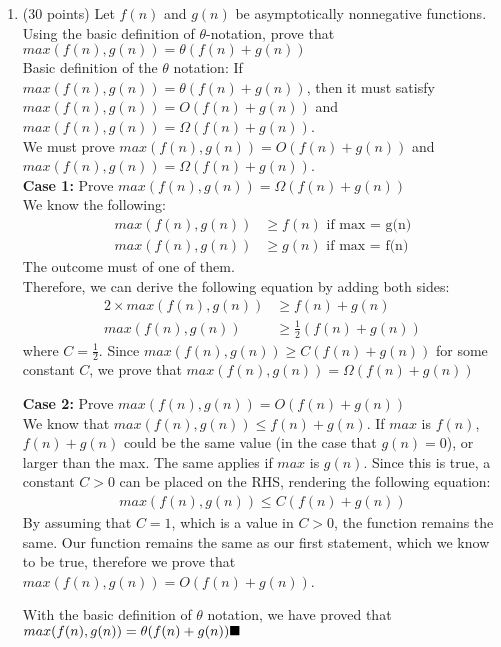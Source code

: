 \documentclass{article}
\begin{document}
    \begin{enumerate}[label=\textbf{Q3}]
        \item (30 points) Let $f(n)$ and $g(n)$ be asymptotically nonnegative functions. Using the basic
        definition of $\theta$-notation, prove that $max(f(n),g(n))= \theta(f(n)+g(n))$\\[0.25in]
        Basic definition of the $\theta$ notation: If $max(f(n),g(n))= \theta(f(n)+g(n))$, then it must 
        satisfy $max(f(n),g(n))= O(f(n)+g(n))$ and $max(f(n),g(n))= \Omega(f(n)+g(n))$.\\
        We must prove $max(f(n),g(n))= O(f(n)+g(n))$ and $max(f(n),g(n))= \Omega(f(n)+g(n))$.\\
        \textbf{Case 1: } Prove $max(f(n),g(n))= \Omega(f(n)+g(n))$\\
        We know the following:
        \begin{align*}
            max(f(n), g(n)) &\geq f(n) \text{ if max = g(n)}\\
            max(f(n), g(n)) &\geq g(n) \text{ if max = f(n)}
        \end{align*}
        The outcome must of one of them.\\
        Therefore, we can derive the following equation by adding both sides:
        \begin{align*}
            2 \times max(f(n), g(n)) &\geq f(n) + g(n)\\
            max(f(n), g(n)) &\geq \frac{1}{2}(f(n) + g(n))
        \end{align*}
        where $C = \frac{1}{2}$. Since $max(f(n), g(n)) \geq C (f(n)+g(n))$ for some constant $C$, 
        we prove that $max(f(n), g(n)) = \Omega(f(n) + g(n))$

        \textbf{Case 2: } Prove $max(f(n), g(n)) = O(f(n) + g(n))$\\
        We know that $max(f(n), g(n)) \leq f(n) + g(n)$. If $max$ is $f(n)$, $f(n) + g(n)$ could be the same value (in the case that $g(n) = 0$), or larger than the max. The same applies if $max$ is $g(n)$. Since this is true, a constant $C > 0$ can be placed
        on the RHS, rendering the following equation:
        \begin{align*}
            max(f(n),g(n)) \leq C(f(n) + g(n))
        \end{align*}
        By assuming that $C = 1$, which is a value in $C > 0$, the function remains the same. Our function remains the same as our first statement, which we know to be true, therefore we prove that $max(f(n), g(n)) = O(f(n) + g(n))$.

        With the basic definition of $\theta$ notation, we have proved that $max(f(n), g(n)) = \theta(f(n) + g(n)) \hfill \blacksquare$
    \end{enumerate}
\end{document}
